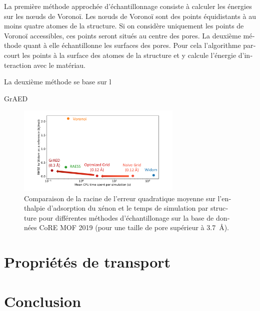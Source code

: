 \documentclass[thesis]{subfiles}
\begin{document}
\begin{otherlanguage}{french}
La première méthode approchée d'échantillonnage consiste à calculer les énergies sur les n\oe{}uds de Voronoï. Les n\oe{}uds de Voronoï sont des points équidistants à au moins quatre atomes de la structure. Si on considère uniquement les points de Voronoï accessibles, ces points seront situés au centre des pores. La deuxième méthode quant à elle échantillonne les surfaces des pores. Pour cela l'algorithme parcourt les points à la surface des atomes de la structure et y calcule l'énergie d'interaction avec le matériau. 

La deuxième méthode se base sur l

GrAED

\begin{figure}[ht]
    \centering
      \includegraphics[width=0.7\textwidth]{figures/3-fastsim/Grid_sumup.pdf}
      \caption{Comparaison de la racine de l'erreur quadratique moyenne sur l'enthalpie d'adsorption du xénon et le temps de simulation par structure pour différentes méthodes d'échantillonage  sur la base de données CoRE MOF 2019 (pour une taille de pore supérieur à \SI{3.7}{\angstrom}). }\label{fgr:grid_perfomance}
  \end{figure}
  

\section*{Propriétés de transport}



\section*{Conclusion}



\vfill
\begin{center}
\end{center}
\vfill\vfill

\end{otherlanguage}

\OnlyInSubfile{\printglobalbibliography}
\end{document}
